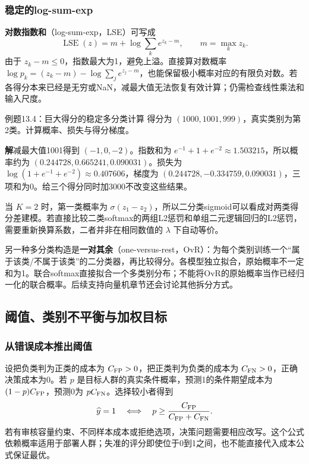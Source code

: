 \documentclass[UTF8,fontset=none,zihao=-4,a4paper]{ctexart}
\newcommand{\term}[1]{\textbf{#1}}
\newcommand{\sol}{\par\noindent\textbf{解}\quad}
\numberwithin{equation}{section}
\numberwithin{figure}{section}
\begin{document}
\subsubsection{稳定的log-sum-exp}
\term{对数指数和}（log-sum-exp，LSE）可写成
\[
 \operatorname{LSE}(z)=m+\log\sum_k e^{z_k-m},\qquad m=\max_k z_k.
\]
由于 $z_k-m\le0$，指数最大为1，避免上溢。直接算对数概率 $\log p_k=(z_k-m)-\log\sum_j e^{z_j-m}$，也能保留极小概率对应的有限负对数。若各得分本来已经是无穷或NaN，减最大值无法恢复有效计算；仍需检查线性乘法和输入尺度。

\begin{infobox}[unbreakable]{例题13.4：巨大得分的稳定多分类计算}
得分为 $(1000,1001,999)$，真实类别为第2类。计算概率、损失与得分梯度。
\sol 减最大值1001得到 $(-1,0,-2)$。指数和为 $e^{-1}+1+e^{-2}\approx1.503215$，所以概率约为 $(0.244728,0.665241,0.090031)$。损失为 $\log(1+e^{-1}+e^{-2})\approx0.407606$，梯度为 $(0.244728,-0.334759,0.090031)$，三项和为0。给三个得分同时加3000不改变这些结果。
\end{infobox}
当 $K=2$ 时，第一类概率为 $\sigma(z_1-z_2)$，所以二分类sigmoid可以看成对两类得分差建模。若直接比较二类softmax的两组L2惩罚和单组二元逻辑回归的L2惩罚，需要重新换算系数，二者并非在相同数值的 $\lambda$ 下自动等价。

另一种多分类构造是\term{一对其余}（one-versus-rest，OvR）：为每个类别训练一个“属于该类/不属于该类”的二分类器，再比较得分。各模型独立拟合，原始概率不一定和为1。联合softmax直接拟合一个多类别分布；不能将OvR的原始概率当作已经归一化的联合概率。后续支持向量机章节还会讨论其他拆分方式。

\subsection{阈值、类别不平衡与加权目标}
\subsubsection{从错误成本推出阈值}
设把负类判为正类的成本为 $C_{\rm FP}>0$，把正类判为负类的成本为 $C_{\rm FN}>0$，正确决策成本为0。若 $p$ 是目标人群的真实条件概率，预测1的条件期望成本为 $(1-p)C_{\rm FP}$，预测0为 $pC_{\rm FN}$。选择较小者得到
\begin{equation}
 \widehat y=1\quad\Longleftrightarrow\quad
 p\ge\frac{C_{\rm FP}}{C_{\rm FP}+C_{\rm FN}}.
\end{equation}
若有审核容量约束、不同样本成本或拒绝选项，决策问题需要相应改写。这个公式依赖概率适用于部署人群；失准的评分即使位于0到1之间，也不能直接代入成本公式保证最优。
\end{document}
